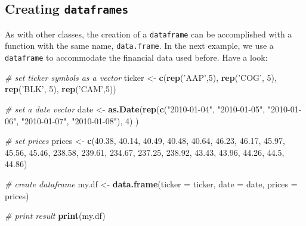 \documentclass[11pt,]{book}
\newenvironment{Shaded}{\begin{snugshade}}{\end{snugshade}}
\newcommand{\KeywordTok}[1]{\textcolor[rgb]{0.27,0.27,0.27}{\textbf{#1}}}
\newcommand{\DataTypeTok}[1]{\textcolor[rgb]{0.27,0.27,0.27}{#1}}
\newcommand{\DecValTok}[1]{\textcolor[rgb]{0.06,0.06,0.06}{#1}}
\newcommand{\FloatTok}[1]{\textcolor[rgb]{0.06,0.06,0.06}{#1}}
\newcommand{\StringTok}[1]{\textcolor[rgb]{0.5,0.5,0.5}{#1}}
\newcommand{\CommentTok}[1]{\textcolor[rgb]{0.56,0.35,0.01}{\textit{#1}}}
\newcommand{\NormalTok}[1]{#1}
\begin{document}
\subsection{\texorpdfstring{Creating
\texttt{dataframes}}{Creating dataframes}}\label{creating-dataframes}

As with other classes, the creation of a \texttt{dataframe} can be
accomplished with a function with the same name, \texttt{data.frame}. In
the next example, we use a \texttt{dataframe} to accommodate the
financial data used before. Have a look: 

\begin{Shaded}
\begin{Highlighting}[]
\CommentTok{# set ticker symbols as a vector}
\NormalTok{ticker <-}\StringTok{ }\KeywordTok{c}\NormalTok{(}\KeywordTok{rep}\NormalTok{(}\StringTok{'AAP'}\NormalTok{,}\DecValTok{5}\NormalTok{), }\KeywordTok{rep}\NormalTok{(}\StringTok{'COG'}\NormalTok{, }\DecValTok{5}\NormalTok{), }\KeywordTok{rep}\NormalTok{(}\StringTok{'BLK'}\NormalTok{, }\DecValTok{5}\NormalTok{), }\KeywordTok{rep}\NormalTok{(}\StringTok{'CAM'}\NormalTok{,}\DecValTok{5}\NormalTok{))}

\CommentTok{# set a date vector}
\NormalTok{date <-}\StringTok{ }\KeywordTok{as.Date}\NormalTok{(}\KeywordTok{rep}\NormalTok{(}\KeywordTok{c}\NormalTok{(}\StringTok{"2010-01-04"}\NormalTok{, }\StringTok{"2010-01-05"}\NormalTok{, }\StringTok{"2010-01-06"}\NormalTok{, }
                      \StringTok{"2010-01-07"}\NormalTok{, }\StringTok{"2010-01-08"}\NormalTok{), }\DecValTok{4}\NormalTok{) )}

\CommentTok{# set prices                      }
\NormalTok{prices <-}\StringTok{ }\KeywordTok{c}\NormalTok{(}\FloatTok{40.38}\NormalTok{,  }\FloatTok{40.14}\NormalTok{,  }\FloatTok{40.49}\NormalTok{,  }\FloatTok{40.48}\NormalTok{,  }\FloatTok{40.64}\NormalTok{,}
            \FloatTok{46.23}\NormalTok{,  }\FloatTok{46.17}\NormalTok{,  }\FloatTok{45.97}\NormalTok{,  }\FloatTok{45.56}\NormalTok{,  }\FloatTok{45.46}\NormalTok{,}
            \FloatTok{238.58}\NormalTok{, }\FloatTok{239.61}\NormalTok{, }\FloatTok{234.67}\NormalTok{, }\FloatTok{237.25}\NormalTok{, }\FloatTok{238.92}\NormalTok{,}
            \FloatTok{43.43}\NormalTok{,  }\FloatTok{43.96}\NormalTok{,  }\FloatTok{44.26}\NormalTok{,  }\FloatTok{44.5}\NormalTok{,   }\FloatTok{44.86}\NormalTok{)}

\CommentTok{# create dataframe          }
\NormalTok{my.df <-}\StringTok{ }\KeywordTok{data.frame}\NormalTok{(}\DataTypeTok{ticker =}\NormalTok{ ticker, }
                    \DataTypeTok{date =}\NormalTok{ date, }
                    \DataTypeTok{prices =}\NormalTok{ prices)}

\CommentTok{# print result}
\KeywordTok{print}\NormalTok{(my.df)}
\end{Highlighting}
\end{Shaded}
\end{document}
